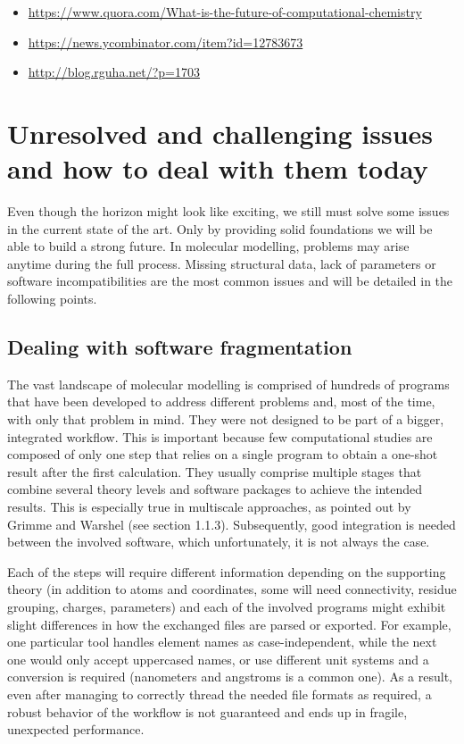 \begin{itemize}
	\item \href{https://www.quora.com/What-is-the-future-of-computational-chemistry}{https://www.quora.com/What-is-the-future-of-computational-chemistry}

	\item \href{https://news.ycombinator.com/item?id=12783673}{https://news.ycombinator.com/item?id=12783673}

	\item \href{http://blog.rguha.net/?p=1703}{http://blog.rguha.net/?p=1703}
\end{itemize}

\section{Unresolved and challenging issues and how to deal with them today}
Even though the horizon might look like exciting, we still must solve some issues in the current state of the art. Only by providing solid foundations we will be able to build a strong future. In molecular modelling, problems may arise anytime during the full process. Missing structural data, lack of parameters or software incompatibilities are the most common issues and will be detailed in the following points.

\subsection{Dealing with software fragmentation}
The vast landscape of molecular modelling is comprised of hundreds of programs that have been developed to address different problems and, most of the time, with only that problem in mind. They were not designed to be part of a bigger, integrated workflow. This is important because few computational studies are composed of only one step that relies on a single program to obtain a one-shot result after the first calculation. They usually comprise multiple stages that combine several theory levels and software packages to achieve the intended results. This is especially true in multiscale approaches, as pointed out by Grimme and Warshel (see section 1.1.3). Subsequently, good integration is needed between the involved software, which unfortunately, it is not always the case.

Each of the steps will require different information depending on the supporting theory (in addition to atoms and coordinates, some will need connectivity, residue grouping, charges, parameters) and each of the involved programs might exhibit slight differences in how the exchanged files are parsed or exported. For example, one particular tool handles element names as case-independent, while the next one would only accept uppercased names, or use different unit systems and a conversion is required (nanometers and angstroms is a common one). As a result, even after managing to correctly thread the needed file formats as required, a robust behavior of the workflow is not guaranteed and ends up in fragile, unexpected performance.

